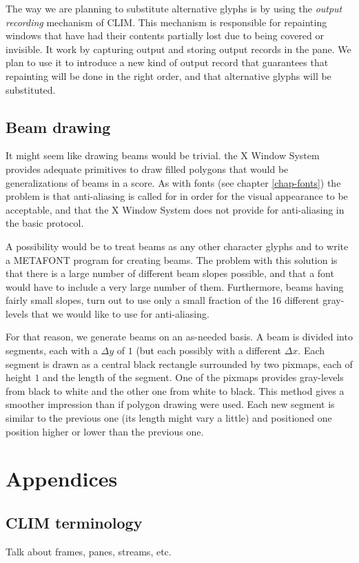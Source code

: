 \documentclass[11pt]{book}
\def\clim{CLIM}
\def\xwin{the X Window System}
\def\metafont{METAFONT}
\def\inputtex#1{}
\begin{document}
The way we are planning to substitute alternative glyphs is by using
the \emph{output recording} mechanism of {\clim}.  This mechanism is
responsible for repainting windows that have had their contents
partially lost due to being covered or invisible.  It work by
capturing output and storing output records in the pane.  We plan to
use it to introduce a new kind of output record that guarantees that
repainting  will be done in the right order, and that alternative
glyphs will be substituted. 

\chapter{Beam drawing}

It might seem like drawing beams would be trivial.  {\xwin} provides
adequate primitives to draw filled polygons that would be
generalizations of beams in a score.  As with fonts (see chapter
\ref{chap-fonts}) the problem is that anti-aliasing is called for in
order for the visual appearance to be acceptable, and that {\xwin}
does not provide for anti-aliasing in the basic protocol.  

A possibility would be to treat beams as any other character glyphs
and to write a {\metafont} program for creating beams.  The problem
with this solution is that there is a large number of different beam
slopes possible, and that a font would have to include a very large
number of them.  Furthermore, beams having fairly small slopes, turn
out to use only a small fraction of the 16 different gray-levels that
we would like to use for anti-aliasing. 

For that reason, we generate beams on an as-needed basis.  A beam is
divided into segments, each with a $\Delta y$ of $1$ (but each
possibly with a different $\Delta x$.  Each segment is drawn as a
central black rectangle surrounded by two pixmaps, each of height $1$
and the length of the segment.  One of the pixmaps provides
gray-levels from black to white and the other one from white to
black.  This method gives a smoother impression than if polygon
drawing were used.  Each new segment is similar to the previous one
(its length might vary a little) and positioned one position higher or
lower than the previous one.

\part{Appendices}
\appendix

\inputtex{history.tex}
\inputtex{beaming-algo.tex}
\inputtex{accidentals.tex}
\inputtex{release-notes.tex}
\inputtex{plans.tex}

\chapter{{\clim} terminology}
\label{clim-terminology}

Talk about frames, panes, streams, etc.

\printindex
\end{document}
